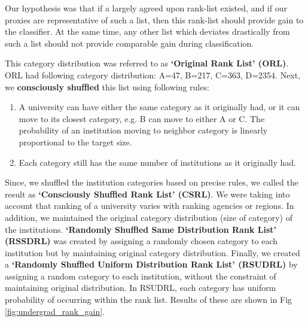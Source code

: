 \documentclass{sig-alternate-05-2015}
\begin{document}
Our hypothesis was that if a largely agreed upon rank-list existed, and if our proxies are representative of such a list, then this rank-list should provide gain to the classifier. At the same time, any other list which deviates drastically from such a list should not provide comparable gain during classification.

This category distribution was referred to as \textbf{`Original Rank List' (ORL)}. ORL had following category distribution: A=47, B=217, C=363, D=2354. Next, we \textbf{consciously shuffled} this list using following rules:
\begin{enumerate}
\item A university can have either the same category as it originally had, or it can move to its closest category, e.g. B can move to either A or C. The probability of an institution moving to neighbor category is linearly proportional to the target size.
\item Each category still has the same number of institutions as it originally had.
\end{enumerate}

Since, we shuffled the institution categories based on precise rules, we called the result as \textbf{`Consciously Shuffled Rank List' (CSRL)}. We were taking into account that ranking of a university varies with ranking agencies or regions. In addition, we maintained the original category distribution (size of category) of the institutions. \textbf{`Randomly Shuffled Same Distribution Rank List' (RSSDRL)} was created by assigning a randomly chosen category to each institution but by maintaining original category distribution. Finally, we created a \textbf{`Randomly Shuffled Uniform Distribution Rank List' (RSUDRL)} by assigning a random category to each institution, without the constraint of maintaining original distribution. In RSUDRL, each category has uniform probability of occurring within the rank list. Results of these are shown in Fig \ref{fig:undergrad_rank_gain}.
\end{document}
